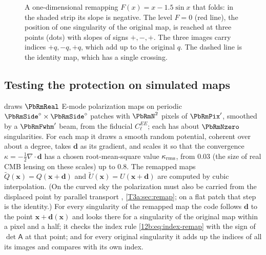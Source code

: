 \begin{figure}[htbp]
\centering
{}
\caption{A one-dimensional remapping $F(x)=x-1.5\sin x$ that folds: in the shaded strip its slope is negative. The level
$F=0$ (red line), the position of one singularity of the original map, is reached at three points (dots) with slopes of
signs $+,-,+$. The three images carry indices $+q,-q,+q$, which add up to the original $q$. The dashed line is the
identity map, which has a single crossing.}
\label{12b:fig:fold}
\end{figure}

\subsection{Testing the protection on simulated maps}
\label{12b:sec:remap-test}

 draws $\PbRmReal$ E-mode polarization maps on periodic $\PbRmSide^\circ\times
\PbRmSide^\circ$ patches with $\PbRmN^2$ pixels of $\PbRmPix'$, smoothed by a $\PbRmFwhm'$ beam, from the fiducial
$C_\ell^{EE}$; each has about $\PbRmNzero$ singularities. For each map it draws a smooth random potential, coherent over
about a degree, takes $\bm d$ as its gradient, and scales it so that the convergence $\kappa=-\frac12\nabla\cdot\bm d$
has a chosen root-mean-square value $\kappa_{\rm rms}$, from $0.03$ (the size of real CMB lensing on these scales) up to
$0.8$. The remapped maps $\tilde Q(\bm x)=Q(\bm x+\bm d)$ and $\tilde U(\bm x)=U(\bm x+\bm d)$ are computed by cubic
interpolation. (On the curved sky the polarization must also be carried from the displaced point by parallel transport
\cite{ChallinorChon2002}, \cref{T3a:sec:remap}; on a flat patch that step is the identity.) For every singularity of
the remapped map the code follows $\bm d$ to the point
$\bm x+\bm d(\bm x)$ and looks there for a singularity of the original map within a pixel and a half; it checks the
index rule \eqref{12b:eq:index-remap} with the sign of $\det\mathsf A$ at that point; and for every original singularity
it adds up the indices of all its images and compares with its own index.


